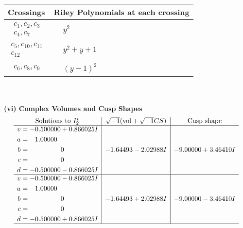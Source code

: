 \documentclass[1p]{elsarticle_modified}
\theoremstyle{definition}
\newcommand{\I}{\sqrt{-1}}
\begin{document}
\begin{tabular}{m{50pt}|m{274pt}}
Crossings & \hspace{64pt}Riley Polynomials at each crossing \\
\hline $$\begin{aligned}c_{1},c_{2},c_{3}\\c_{4},c_{7}\end{aligned}$$&$\begin{aligned}
&y^2
\end{aligned}$\\
\hline $$\begin{aligned}c_{5},c_{10},c_{11}\\c_{12}\end{aligned}$$&$\begin{aligned}
&y^2+y+1
\end{aligned}$\\
\hline $$\begin{aligned}c_{6},c_{8},c_{9}\end{aligned}$$&$\begin{aligned}
&(y-1)^2
\end{aligned}$\\
\hline
\end{tabular}\\~\\
\newpage\flushleft \textbf{(vi) Complex Volumes and Cusp Shapes}
$$\begin{array}{c|c|c}  
\text{Solutions to }I^v_{2}& \I (\text{vol} + \sqrt{-1}CS) & \text{Cusp shape}\\
 \hline 
\begin{aligned}
v &= -0.500000 + 0.866025 I \\
a &= \phantom{-}1.00000\phantom{ +0.000000I} \\
b &= \phantom{-0.000000 } 0 \\
c &= \phantom{-0.000000 } 0 \\
d &= -0.500000 - 0.866025 I\end{aligned}
 & -1.64493 - 2.02988 I & -9.00000 + 3.46410 I \\ \hline\begin{aligned}
v &= -0.500000 - 0.866025 I \\
a &= \phantom{-}1.00000\phantom{ +0.000000I} \\
b &= \phantom{-0.000000 } 0 \\
c &= \phantom{-0.000000 } 0 \\
d &= -0.500000 + 0.866025 I\end{aligned}
 & -1.64493 + 2.02988 I & -9.00000 - 3.46410 I\\
 \hline 
 \end{array}$$\newpage\newpage\renewcommand{\arraystretch}{1}
\end{document}
